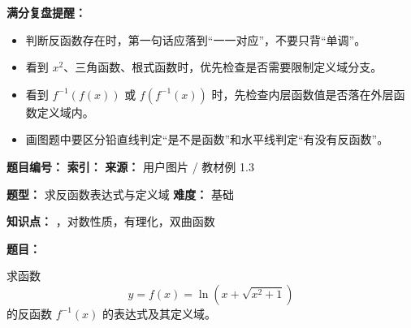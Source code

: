\begin{mistakeBox}
\textbf{满分复盘提醒：}

\begin{itemize}
  \item 判断反函数存在时，第一句话应落到“一一对应”，不要只背“单调”。
  \item 看到 \(x^2\)、三角函数、根式函数时，优先检查是否需要限制定义域分支。
  \item 看到 \(f^{-1}(f(x))\) 或 \(f(f^{-1}(x))\) 时，先检查内层函数值是否落在外层函数定义域内。
  \item 画图题中要区分铅直线判定“是不是函数”和水平线判定“有没有反函数”。
\end{itemize}
\end{mistakeBox}


\begin{problemBox}
\begin{problemMeta}
\textbf{题目编号：}  \quad
\textbf{索引：}  \quad
\textbf{来源：} 用户图片 / 教材例 1.3

\textbf{题型：} 求反函数表达式与定义域 \quad
\textbf{难度：} 基础

\textbf{知识点：} ，对数性质，有理化，双曲函数
\end{problemMeta}

\textbf{题目：}

求函数
\[
y=f(x)=\ln\left(x+\sqrt{x^2+1}\right)
\]
的反函数 \(f^{-1}(x)\) 的表达式及其定义域。
\end{problemBox}

